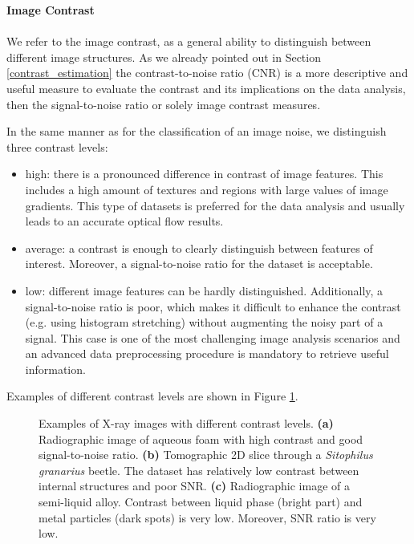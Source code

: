 \vspace{0.4cm}
\textbf{Image Contrast}
\\
\\
We refer to the image contrast, as a general ability to distinguish between different image structures. As we already pointed out in Section \ref{contrast_estimation} the contrast-to-noise ratio (CNR) is a more descriptive and useful measure to evaluate the contrast and its implications on the data analysis, then the signal-to-noise ratio or solely image contrast measures.

In the same manner as for the classification of an image noise, we distinguish three contrast levels:
\begin{itemize}
	\item high: there is a pronounced difference in contrast of image features. This includes a high amount of textures and regions with large values of image gradients. This type of datasets is preferred for the  data analysis and usually leads to an accurate optical flow results.
	
	\item average: a contrast is enough to clearly distinguish between features of interest. Moreover, a signal-to-noise ratio for the dataset is acceptable.
	
	\item low: different image features can be hardly distinguished. Additionally, a signal-to-noise ratio is poor, which makes it difficult to enhance the contrast (e.g. using histogram stretching) without augmenting the noisy part of a signal. This case is one of the most challenging image analysis scenarios and an advanced data preprocessing procedure is mandatory to retrieve useful information. 
	 
	  
	
\end{itemize}

Examples of different contrast levels are shown in Figure \ref{fig:contrast_level_examples}.

\begin{figure}[ht]
	
	\centerline{
		\mbox{}
		\mbox{}
		\mbox{}
	} 
	\caption[]{Examples of X-ray images with different contrast levels. \textbf{(a)} Radiographic image of aqueous foam with high contrast and good signal-to-noise ratio. \textbf{(b)} Tomographic 2D slice through a \textit{Sitophilus granarius} beetle. The dataset has relatively low contrast between internal structures and poor SNR. \textbf{(c)} Radiographic image of a semi-liquid alloy. Contrast between liquid phase (bright part) and metal particles (dark spots) is very low. Moreover, SNR ratio  is very low.}
	\label{fig:contrast_level_examples}
\end{figure}

